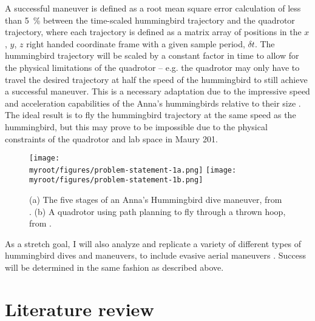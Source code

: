 \documentclass[onecolumn,10pt]{IEEEtran}
\newcommand{\myroot}{../}
\begin{document}
A successful maneuver is defined as a root mean square error calculation of less than \SI{5}{\percent} between the time-scaled hummingbird trajectory and the quadrotor trajectory, where each trajectory is defined as a matrix array of positions in the $x$, $y$, $z$ right handed coordinate frame with a given sample period, $\delta t$. The hummingbird trajectory will be scaled by a constant factor in time to allow for the physical limitations of the quadrotor -- e.g. the quadrotor may only have to travel the desired trajectory at half the speed of the hummingbird to still achieve a successful maneuver. This is a necessary adaptation due to the impressive speed and acceleration capabilities of the Anna’s hummingbirds relative to their size \cite{clark2009courtship}. The ideal result is to fly the hummingbird trajectory at the same speed as the hummingbird, but this may prove to be impossible due to the physical constraints of the quadrotor and lab space in Maury 201.
\begin{figure}[h]
\begin{center}
\texttt{[image: \\myroot/figures/problem-statement-1a.png]}%
\texttt{[image: \\myroot/figures/problem-statement-1b.png]}
\end{center}
\caption{(a) The five stages of an Anna’s Hummingbird dive maneuver, from \cite{clark2009courtship}. (b) A quadrotor using path planning to fly through a thrown hoop, from \cite{mellinger2011minimum}.}
\label{fig:problem-statement-1}
\end{figure}

As a stretch goal, I will also analyze and replicate a variety of different types of hummingbird dives and maneuvers, to include evasive aerial maneuvers \cite{sholtis2015field, cheng2016flight}. Success will be determined in the same fashion as described above.





\section{Literature review}
\end{document}
